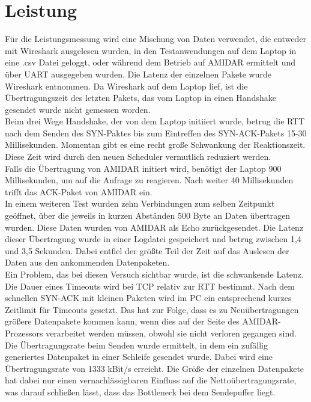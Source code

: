 \section{Leistung}
Für die Leistungsmessung wird eine Mischung von Daten verwendet, die entweder mit Wireshark ausgelesen wurden, in den Testanwendungen auf dem Laptop in eine .csv Datei geloggt, oder während dem Betrieb auf AMIDAR ermittelt und über UART ausgegeben wurden. 
Die Latenz der einzelnen Pakete wurde Wireshark entnommen. Da Wireshark auf dem Laptop lief, ist die Übertragungszeit des letzten Pakets, das vom Laptop in einen Handshake gesendet wurde nicht gemessen worden. \\
Beim drei Wege Handshake, der von dem Laptop initiiert wurde, betrug die RTT nach dem Senden des SYN-Paktes bis zum Eintreffen des SYN-ACK-Pakets 15-30 Millisekunden. Momentan gibt es eine recht große Schwankung der Reaktionszeit. Diese Zeit wird durch den neuen Scheduler vermutlich reduziert werden.\\
Falls die Übertragung von AMIDAR initiert wird, benötigt der Laptop 900 Millisekunden, um auf die Anfrage zu reagieren. Nach weiter 40 Millisekunden trifft das ACK-Paket von AMIDAR ein.\\
In einem weiteren Test wurden zehn Verbindungen zum selben Zeitpunkt geöffnet, über die jeweils in kurzen Abständen 500 Byte an Daten übertragen wurden. Diese Daten wurden von AMIDAR als Echo zurückgesendet. Die Latenz dieser Übertragung wurde in einer Logdatei gespeichert und betrug zwischen 1,4 und 3,5 Sekunden. Dabei entfiel der größte Teil der Zeit auf das Auslesen der Daten aus den ankommenden Datenpaketen.\\
Ein Problem, das bei diesen Versuch sichtbar wurde, ist die schwankende Latenz. Die Dauer eines Timeouts wird bei TCP relativ zur RTT bestimmt. Nach dem schnellen SYN-ACK mit kleinen Paketen wird im PC ein entsprechend kurzes Zeitlimit für Timeouts gesetzt. Das hat zur Folge, dass es zu Neuübertragungen größere Datenpakete kommen kann, wenn dies auf der Seite des AMIDAR-Prozessors verarbeitet werden müssen, obwohl sie nicht verloren gegangen sind.\\
Die Übertragungsrate beim Senden wurde ermittelt, in dem ein zufällig generiertes Datenpaket in einer Schleife gesendet wurde. Dabei wird eine Übertragungsrate von 1333 kBit/s erreicht. Die Größe der einzelnen Datenpakete hat dabei nur einen vernachlässigbaren Einfluss auf die Nettoübertragungsrate, was darauf schließen lässt, dass das Bottleneck bei dem Sendepuffer liegt. 




 

 